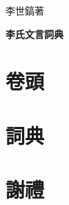 \documentclass[a4paper]{ltjtbook}
\begin{document}
\begin{titlepage}
\textcolor{wh}
\vfill
{\fontsize{8mm}{12mm}\selectfont\textcolor{wh}{李世鎬\hspace{10mm}著}}

\vspace{12mm}

{\fontsize{12mm}{18mm}\bfseries\selectfont\textcolor{wh}{\hspace{10mm}李氏文言詞典}}
\vspace{4mm}
\end{titlepage}
\newpage
\chapter*{\textbf{卷頭}}
\onehalfspacing
\fontsize{4mm}{6mm}\selectfont

\chapter*{\textbf{詞典}}
\onehalfspacing
\fontsize{4mm}{6mm}\selectfont
{\flushleft}
\chapter*{\textbf{謝禮}}
\onehalfspacing
\fontsize{4mm}{6mm}\selectfont

\end{document}
